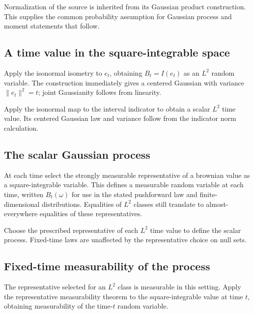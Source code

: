 \documentclass[11pt,a4paper]{article}
\begin{document}
Normalization of the source is inherited from its Gaussian product construction. This supplies the common probability assumption for Gaussian process and moment statements that follow.


\subsection{\texorpdfstring{A time value in the square-integrable space}{A time value in the square-integrable space}}


Apply the isonormal isometry to \(e_t\), obtaining \(B_t=I(e_t)\) as an \(L^2\) random variable. The construction immediately gives a centered Gaussian with variance \(\|e_t\|^2=t\); joint Gaussianity follows from linearity.



Apply the isonormal map to the interval indicator to obtain a scalar \(L^2\) time value. Its centered Gaussian law and variance follow from the indicator norm calculation.


\subsection{\texorpdfstring{The scalar Gaussian process}{The scalar Gaussian process}}


At each time select the strongly measurable representative of a brownian value as a square-integrable variable. This defines a measurable random variable at each time, written \(B_t(\omega)\) for use in the stated pushforward law and finite-dimensional distributions. Equalities of \(L^2\) classes still translate to almost-everywhere equalities of these representatives.



Choose the prescribed representative of each \(L^2\) time value to define the scalar process. Fixed-time laws are unaffected by the representative choice on null sets.


\subsection{\texorpdfstring{Fixed-time measurability of the process}{Fixed-time measurability of the process}}


The representative selected for an \(L^2\) class is measurable in this setting. Apply the representative measurability theorem to the square-integrable value at time \(t\), obtaining measurability of the time-\(t\) random variable.
\end{document}
